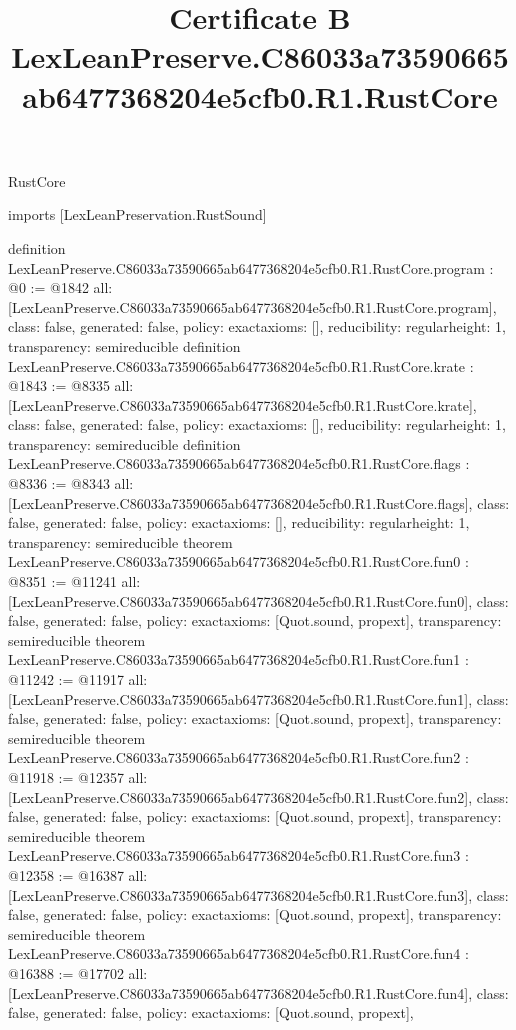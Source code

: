 \begin{lexlean}{RustCore}
\title{Certificate B LexLeanPreserve.C86033a73590665ab6477368204e5cfb0.R1.RustCore}
\begin{coremodule}
imports [LexLeanPreservation.RustSound]

definition LexLeanPreserve.C86033a73590665ab6477368204e5cfb0.R1.RustCore.program : @0 := @1842 {
  all: [LexLeanPreserve.C86033a73590665ab6477368204e5cfb0.R1.RustCore.program],
  class: false,
  generated: false,
  policy: exact{axioms: []},
  reducibility: regular{height: 1},
  transparency: semireducible
}
definition LexLeanPreserve.C86033a73590665ab6477368204e5cfb0.R1.RustCore.krate : @1843 := @8335 {
  all: [LexLeanPreserve.C86033a73590665ab6477368204e5cfb0.R1.RustCore.krate],
  class: false,
  generated: false,
  policy: exact{axioms: []},
  reducibility: regular{height: 1},
  transparency: semireducible
}
definition LexLeanPreserve.C86033a73590665ab6477368204e5cfb0.R1.RustCore.flags : @8336 := @8343 {
  all: [LexLeanPreserve.C86033a73590665ab6477368204e5cfb0.R1.RustCore.flags],
  class: false,
  generated: false,
  policy: exact{axioms: []},
  reducibility: regular{height: 1},
  transparency: semireducible
}
theorem LexLeanPreserve.C86033a73590665ab6477368204e5cfb0.R1.RustCore.fun0 : @8351 := @11241 {
  all: [LexLeanPreserve.C86033a73590665ab6477368204e5cfb0.R1.RustCore.fun0],
  class: false,
  generated: false,
  policy: exact{axioms: [Quot.sound, propext]},
  transparency: semireducible
}
theorem LexLeanPreserve.C86033a73590665ab6477368204e5cfb0.R1.RustCore.fun1 : @11242 := @11917 {
  all: [LexLeanPreserve.C86033a73590665ab6477368204e5cfb0.R1.RustCore.fun1],
  class: false,
  generated: false,
  policy: exact{axioms: [Quot.sound, propext]},
  transparency: semireducible
}
theorem LexLeanPreserve.C86033a73590665ab6477368204e5cfb0.R1.RustCore.fun2 : @11918 := @12357 {
  all: [LexLeanPreserve.C86033a73590665ab6477368204e5cfb0.R1.RustCore.fun2],
  class: false,
  generated: false,
  policy: exact{axioms: [Quot.sound, propext]},
  transparency: semireducible
}
theorem LexLeanPreserve.C86033a73590665ab6477368204e5cfb0.R1.RustCore.fun3 : @12358 := @16387 {
  all: [LexLeanPreserve.C86033a73590665ab6477368204e5cfb0.R1.RustCore.fun3],
  class: false,
  generated: false,
  policy: exact{axioms: [Quot.sound, propext]},
  transparency: semireducible
}
theorem LexLeanPreserve.C86033a73590665ab6477368204e5cfb0.R1.RustCore.fun4 : @16388 := @17702 {
  all: [LexLeanPreserve.C86033a73590665ab6477368204e5cfb0.R1.RustCore.fun4],
  class: false,
  generated: false,
  policy: exact{axioms: [Quot.sound, propext]},
}
\end{coremodule}
\end{lexlean}
